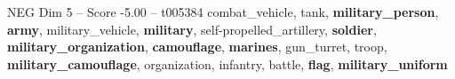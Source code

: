 \begin{textsample}{NEG Dim 5 – Score -5.00 – t005384}  \label{ex:f5_neg_037}
combat\_vehicle, tank, \textbf{military\_person}, \textbf{army}, military\_vehicle, \textbf{military}, self-propelled\_artillery, \textbf{soldier}, \textbf{military\_organization}, \textbf{camouflage}, \textbf{marines}, gun\_turret, troop, \textbf{military\_camouflage}, organization, infantry, battle, \textbf{flag}, \textbf{military\_uniform}

\end{textsample}
